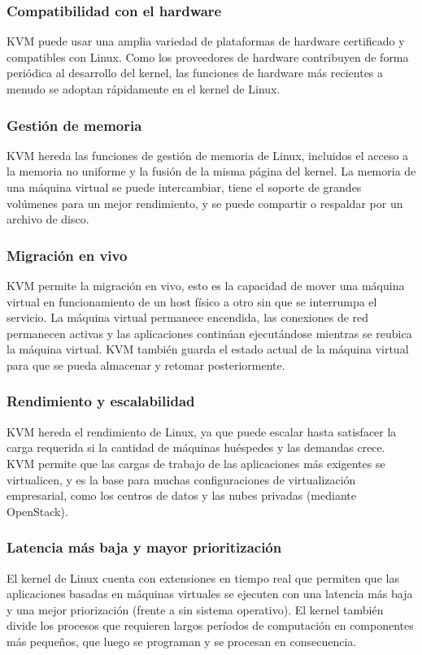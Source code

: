 \documentclass[11pt]{article}
\begin{document}
\subsubsection{Compatibilidad con el hardware}
KVM puede usar una amplia variedad de plataformas de hardware certificado y compatibles con Linux. Como los proveedores de hardware contribuyen de forma periódica al desarrollo del kernel, las funciones de hardware más recientes a menudo se adoptan rápidamente en el kernel de Linux.

\subsubsection{Gestión de memoria}
KVM hereda las funciones de gestión de memoria de Linux, incluidos el acceso a la memoria no uniforme y la fusión de la misma página del kernel. La memoria de una máquina virtual se puede intercambiar, tiene el soporte de grandes volúmenes para un mejor rendimiento, y se puede compartir o respaldar por un archivo de disco.

\subsubsection{Migración en vivo} \label{migración en vivo}
KVM permite la migración en vivo, esto es la capacidad de mover una máquina virtual en funcionamiento de un host físico a otro sin que se interrumpa el servicio. La máquina virtual permanece encendida, las conexiones de red permanecen activas y las aplicaciones continúan ejecutándose mientras se reubica la máquina virtual. KVM también guarda el estado actual de la máquina virtual para que se pueda almacenar y retomar posteriormente.

\subsubsection{Rendimiento y escalabilidad}
KVM hereda el rendimiento de Linux, ya que puede escalar hasta satisfacer la carga requerida si la cantidad de máquinas huéspedes y las demandas crece. KVM permite que las cargas de trabajo de las aplicaciones más exigentes se virtualicen, y es la base para muchas configuraciones de virtualización empresarial, como los centros de datos y las nubes privadas (mediante OpenStack).

\subsubsection{Latencia más baja y mayor prioritización}
El kernel de Linux cuenta con extensiones en tiempo real que permiten que las aplicaciones basadas en máquinas virtuales se ejecuten con una latencia más baja y una mejor priorización (frente a sin sistema operativo). El kernel también divide los procesos que requieren largos períodos de computación en componentes más pequeños, que luego se programan y se procesan en consecuencia.
\end{document}
